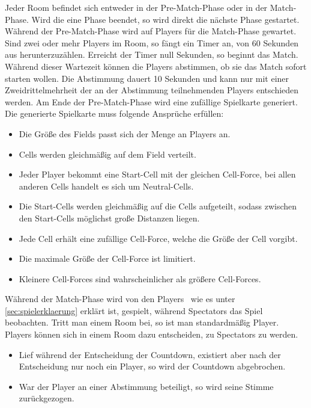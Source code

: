 \begin{description}
		Jeder Room befindet sich entweder in der Pre-Match-Phase oder in der Match-Phase. Wird die eine Phase beendet, so wird direkt die nächste Phase gestartet.
		Während der Pre-Match-Phase wird auf Players für die Match-Phase gewartet. 
		Sind zwei oder mehr Players im Room, so fängt ein Timer an, von 60 Sekunden aus herunterzuzählen. Erreicht der Timer null Sekunden, so beginnt das Match. Während dieser Wartezeit können die Players abstimmen, ob sie das Match sofort starten wollen. Die Abstimmung dauert 10 Sekunden und kann nur mit einer Zweidrittelmehrheit der an der Abstimmung teilnehmenden Players entschieden werden.
		Am Ende der Pre-Match-Phase wird eine zufällige Spielkarte generiert. \\
		Die generierte Spielkarte muss folgende Ansprüche erfüllen:
		\begin{itemize}
			\item Die Größe des Fields passt sich der Menge an Players an.
			\item Cells werden gleichmäßig auf dem Field verteilt.
			\item Jeder Player bekommt eine Start-Cell mit der gleichen Cell-Force, bei allen anderen Cells handelt es sich um Neutral-Cells.
			\item Die Start-Cells werden gleichmäßig auf die Cells aufgeteilt, sodass zwischen den Start-Cells möglichst große Distanzen liegen.
			\item Jede Cell erhält eine zufällige Cell-Force, welche die Größe der Cell vorgibt.
			\item Die maximale Größe der Cell-Force ist limitiert.
			\item Kleinere Cell-Forces sind wahrscheinlicher als größere Cell-Forces.
		\end{itemize}
		Während der Match-Phase wird von den Players \vires\, wie es unter \ref{sec:spielerklaerung} erklärt ist, gespielt, während Spectators das Spiel beobachten.
		Tritt man einem Room bei, so ist man standardmäßig Player. Players können sich in einem Room dazu entscheiden, zu Spectators zu werden.
		\begin{itemize}
			\item Lief während der Entscheidung der Countdown, existiert aber nach der Entscheidung nur noch ein Player, so wird der Countdown abgebrochen.
			\item War der Player an einer Abstimmung beteiligt, so wird seine Stimme zurückgezogen. 

\end{itemize}
\end{description}
